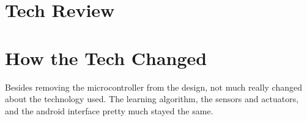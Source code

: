 \section{Tech Review}


\section{How the Tech Changed}
Besides removing the microcontroller from the design, not much really changed about the technology used.
The learning algorithm, the sensors and actuators, and the android interface pretty much stayed the same.

